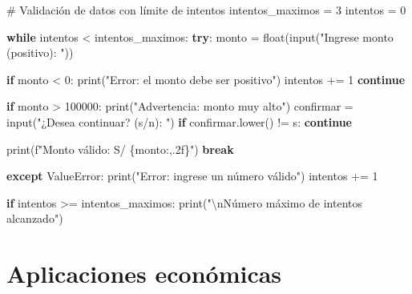 \documentclass[
  doc,
  floatsintext,
  longtable,
  a4paper,
  nolmodern,
  notxfonts,
  notimes,
  12pt,
  colorlinks=true,linkcolor=blue,citecolor=blue,urlcolor=blue]{apa7}
\newenvironment{Shaded}{\begin{snugshade}}{\end{snugshade}}
\newcommand{\BuiltInTok}[1]{\textcolor[rgb]{0.00,0.23,0.31}{#1}}
\newcommand{\CharTok}[1]{\textcolor[rgb]{0.13,0.47,0.30}{#1}}
\newcommand{\CommentTok}[1]{\textcolor[rgb]{0.37,0.37,0.37}{#1}}
\newcommand{\ControlFlowTok}[1]{\textcolor[rgb]{0.00,0.23,0.31}{\textbf{#1}}}
\newcommand{\DecValTok}[1]{\textcolor[rgb]{0.68,0.00,0.00}{#1}}
\newcommand{\NormalTok}[1]{\textcolor[rgb]{0.00,0.23,0.31}{#1}}
\newcommand{\OperatorTok}[1]{\textcolor[rgb]{0.37,0.37,0.37}{#1}}
\newcommand{\PreprocessorTok}[1]{\textcolor[rgb]{0.68,0.00,0.00}{#1}}
\newcommand{\SpecialCharTok}[1]{\textcolor[rgb]{0.37,0.37,0.37}{#1}}
\newcommand{\SpecialStringTok}[1]{\textcolor[rgb]{0.13,0.47,0.30}{#1}}
\newcommand{\StringTok}[1]{\textcolor[rgb]{0.13,0.47,0.30}{#1}}
\begin{document}
\begin{Shaded}
\begin{Highlighting}[]
\CommentTok{\# Validación de datos con límite de intentos}
\NormalTok{intentos\_maximos }\OperatorTok{=} \DecValTok{3}
\NormalTok{intentos }\OperatorTok{=} \DecValTok{0}

\ControlFlowTok{while}\NormalTok{ intentos }\OperatorTok{\textless{}}\NormalTok{ intentos\_maximos:}
    \ControlFlowTok{try}\NormalTok{:}
\NormalTok{        monto }\OperatorTok{=} \BuiltInTok{float}\NormalTok{(}\BuiltInTok{input}\NormalTok{(}\StringTok{"Ingrese monto (positivo): "}\NormalTok{))}
        
        \ControlFlowTok{if}\NormalTok{ monto }\OperatorTok{\textless{}} \DecValTok{0}\NormalTok{:}
            \BuiltInTok{print}\NormalTok{(}\StringTok{"Error: el monto debe ser positivo"}\NormalTok{)}
\NormalTok{            intentos }\OperatorTok{+=} \DecValTok{1}
            \ControlFlowTok{continue}
        
        \ControlFlowTok{if}\NormalTok{ monto }\OperatorTok{\textgreater{}} \DecValTok{100000}\NormalTok{:}
            \BuiltInTok{print}\NormalTok{(}\StringTok{"Advertencia: monto muy alto"}\NormalTok{)}
\NormalTok{            confirmar }\OperatorTok{=} \BuiltInTok{input}\NormalTok{(}\StringTok{"¿Desea continuar? (s/n): "}\NormalTok{)}
            \ControlFlowTok{if}\NormalTok{ confirmar.lower() }\OperatorTok{!=} \StringTok{\textquotesingle{}s\textquotesingle{}}\NormalTok{:}
                \ControlFlowTok{continue}
        
        \BuiltInTok{print}\NormalTok{(}\SpecialStringTok{f"Monto válido: S/ }\SpecialCharTok{\{}\NormalTok{monto}\SpecialCharTok{:,.2f\}}\SpecialStringTok{"}\NormalTok{)}
        \ControlFlowTok{break}
        
    \ControlFlowTok{except} \PreprocessorTok{ValueError}\NormalTok{:}
        \BuiltInTok{print}\NormalTok{(}\StringTok{"Error: ingrese un número válido"}\NormalTok{)}
\NormalTok{        intentos }\OperatorTok{+=} \DecValTok{1}

\ControlFlowTok{if}\NormalTok{ intentos }\OperatorTok{\textgreater{}=}\NormalTok{ intentos\_maximos:}
    \BuiltInTok{print}\NormalTok{(}\StringTok{"}\CharTok{\textbackslash{}n}\StringTok{Número máximo de intentos alcanzado"}\NormalTok{)}
\end{Highlighting}
\end{Shaded}

\section{Aplicaciones económicas}\label{aplicaciones-econuxf3micas-5}
\end{document}
